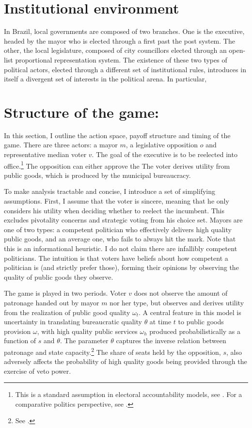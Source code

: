 \documentclass[12pt,]{book}
\let\rmarkdownfootnote\footnote%
\def\footnote{\protect\rmarkdownfootnote}
\begin{document}
\hypertarget{institutional-environment}{%
\section{Institutional environment}\label{institutional-environment}}

In Brazil, local governments are composed of two branches. One is the executive, headed by the mayor who is elected through a first past the post system. The other, the local legislature, composed of city councillors elected through an open-list proportional representation system. The existence of these two types of political actors, elected through a different set of institutional rules, introduces in itself a divergent set of interests in the political arena. In particular,

\hypertarget{structure-of-the-game}{%
\section{Structure of the game:}\label{structure-of-the-game}}

In this section, I outline the action space, payoff structure and timing of the game. There are three actors: a mayor \(m\), a legislative opposition \(o\) and representative median voter \(v\). The goal of the executive is to be reelected into office.\footnote{This is a standard assumption in electoral accountability models, see \citet{besley_principled_2006}. For a comparative politics perspective, see \citet{geddes_politicians_1994}.} The opposition can either approve the The voter derives utility from public goods, which is produced by the municipal bureaucracy.

To make analysis tractable and concise, I introduce a set of simplifying assumptions. First, I assume that the voter is sincere, meaning that he only considers his utility when deciding whether to reelect the incumbent. This excludes pivotality concerns and strategic voting from his choice set. Mayors are one of two types: a competent politician who effectively delivers high quality public goods, and an average one, who fails to always hit the mark. Note that this is an informational heuristic. I do not claim there are infallibly competent politicians. The intuition is that voters have beliefs about how competent a politician is (and strictly prefer those), forming their opinions by observing the quality of public goods they observe.

The game is played in two periods. Voter \(v\) does not observe the amount of patronage handed out by mayor \(m\) nor her type, but observes and derives utility from the realization of public good quality \(\omega_t\). A central feature in this model is uncertainty in translating bureaucratic quality \(\theta\) at time \(t\) to public goods provision \(\omega\), with high quality public services \(\omega_{h}\) produced probabilistically as a function of \(s\) and \(\theta\). The parameter \(\theta\) captures the inverse relation between patronage and state capacity.\footnote{See \citet{kohli_state-directed_2004}.} The share of seats held by the opposition, \(s\), also adversely affects the probability of high quality goods being provided through the exercise of veto power.
\end{document}
